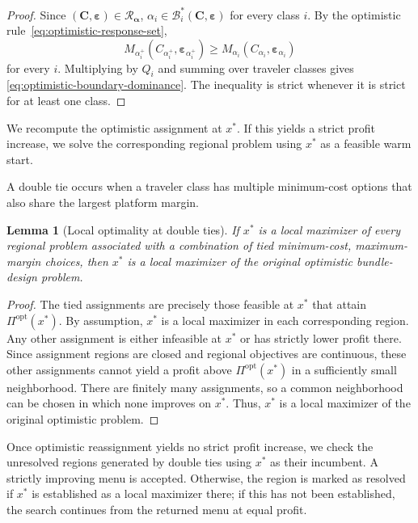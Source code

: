 \documentclass{article}
\newtheorem{lemma}{Lemma}
\begin{document}
\begin{proof}
Since $(\bm C,\bm\varepsilon)\in\mathcal R_{\bm\alpha}$,
$\alpha_i\in\mathcal B_i^*(\bm C,\bm\varepsilon)$ for every class
$i$. By the optimistic rule~\eqref{eq:optimistic-response-set},
\begin{equation}
    M_{\alpha_i^+}
    (C_{\alpha_i^+},\bm\varepsilon_{\alpha_i^+})
    \geq
    M_{\alpha_i}
    (C_{\alpha_i},\bm\varepsilon_{\alpha_i})
\end{equation}
for every $i$. Multiplying by $Q_i$ and summing over traveler classes
gives \eqref{eq:optimistic-boundary-dominance}. The inequality is
strict whenever it is strict for at least one class.
\end{proof}

We recompute the optimistic assignment at $x^*$. If this yields a strict
profit increase, we solve the corresponding regional problem using
$x^*$ as a feasible warm start.

A double tie occurs when a traveler class has multiple minimum-cost
options that also share the largest platform margin.

\begin{lemma}[Local optimality at double ties]
If $x^*$ is a local maximizer of every regional problem associated with a combination
of tied minimum-cost, maximum-margin choices, then $x^*$ is a local
maximizer of the original optimistic bundle-design problem.
\label{lem:double-tie-local-optimality}
\end{lemma}

\begin{proof}
The tied assignments are precisely those feasible at $x^*$ that attain
$\Pi^{\mathrm{opt}}(x^*)$. By assumption, $x^*$ is a local maximizer in
each corresponding region. Any other assignment is either infeasible
at $x^*$ or has strictly lower profit there. Since assignment regions
are closed and regional objectives are continuous, these other
assignments cannot yield a profit above $\Pi^{\mathrm{opt}}(x^*)$ in a
sufficiently small neighborhood. There are finitely many assignments,
so a common neighborhood can be chosen in which none improves on
$x^*$. Thus, $x^*$ is a local maximizer of the original optimistic
problem.
\end{proof}

Once optimistic reassignment yields no strict profit increase, we check
the unresolved regions generated by double ties using $x^*$ as their
incumbent. A strictly improving menu is accepted. Otherwise, the region
is marked as resolved if
$x^*$ is established as a local maximizer there; if this has not been
established, the search continues from the returned menu at equal profit.
\end{document}
